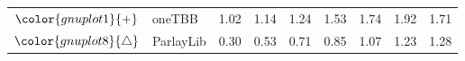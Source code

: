 \begin{tabular}{clrrrrrrr}
\rowcolor{gnuplot1!10}$\color{gnuplot1}{+}$ & oneTBB & \cellcolor{gnuplot1!10} 1.02 & \cellcolor{gnuplot1!10} 1.14 & \cellcolor{gnuplot1!10} 1.24 & \cellcolor{gnuplot1!10} 1.53 & \cellcolor{gnuplot1!10} 1.74 & \cellcolor{gnuplot1!10} 1.92 & \cellcolor{gnuplot1!10} 1.71 \\
\rowcolor{gnuplot8!10}$\color{gnuplot8}{\triangle}$ & ParlayLib & \cellcolor{gnuplot8!10} 0.30 & \cellcolor{gnuplot8!10} 0.53 & \cellcolor{gnuplot8!10} 0.71 & \cellcolor{gnuplot8!10} 0.85 & \cellcolor{gnuplot8!10} 1.07 & \cellcolor{gnuplot8!10} 1.23 & \cellcolor{gnuplot8!10} 1.28 \\
\bottomrule
\end{tabular}
